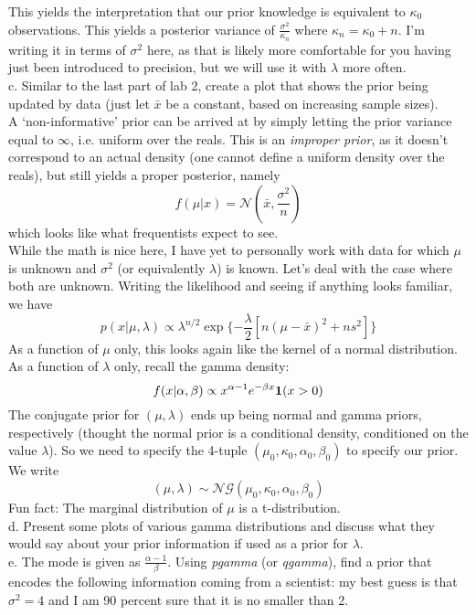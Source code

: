 \documentclass{article}
\begin{document}
This yields the interpretation that our prior knowledge is equivalent to $\kappa_0$ observations. This yields a posterior variance of $\frac{\sigma^2}{\kappa_n}$ where $\kappa_n=\kappa_0+n$. I'm writing it in terms of $\sigma^2$ here, as that is likely more comfortable for you having just been introduced to precision, but we will use it with $\lambda$ more often. \\[10pt] 
c.  Similar to the last part of lab 2, create a plot that shows the prior being updated by data (just let $\bar{x}$ be a constant, based on increasing sample sizes).\\[10pt]
A `non-informative' prior can be arrived at by simply letting the prior variance equal to $\infty$, i.e. uniform over the reals.  This is an {\it improper prior}, as it doesn't correspond to an actual density (one cannot define a uniform density over the reals), but still yields a proper posterior, namely
$$f(\mu|x)=\mathcal{N}(\bar{x},\frac{\sigma^2}{n})$$
which looks like what frequentists expect to see.\\[5pt]
While the math is nice here, I have yet to personally work with data for which $\mu$ is unknown and $\sigma^2$ (or equivalently $\lambda$) is known.  Let's deal with the case where both are unknown. Writing the likelihood and seeing if anything looks familiar, we have 
$$p(x|\mu, \lambda) \propto \lambda^{n/2}\exp\{-\frac{\lambda}{2}[n(\mu-\bar{x})^2+ns^2]\}  $$
As a function of $\mu$ only, this looks again like the kernel of a normal distribution.  As a function of $\lambda$ only, recall the gamma density:
$$f(x|\alpha, \beta)\propto x^{\alpha-1}e^{-\beta x}{\bf 1}(x>0)$$ 
The conjugate prior for $(\mu, \lambda)$ ends up being normal and gamma priors, respectively (thought the normal prior is a conditional density, conditioned on the value $\lambda$).  So we need to specify the 4-tuple $(\mu_0, \kappa_0, \alpha_0, \beta_0)$ to specify our prior.  We write
$$(\mu,\lambda)\sim \mathcal{NG}(\mu_0, \kappa_0, \alpha_0, \beta_0)$$ 
Fun fact: The marginal distribution of $\mu$ is a t-distribution.\\[10pt]
d.  Present some plots of various gamma distributions and discuss what they would say about your prior information if used as a prior for $\lambda$.\\[10pt]
e.  The mode is given as $\frac{\alpha-1}{\beta}$.  Using {\it pgamma} (or {\it qgamma}), find a prior that encodes the following information coming from a scientist:  my best guess is that $\sigma^2=4$ and I am 90 percent sure that it is no smaller than 2.\\[10pt]  
\end{document}
